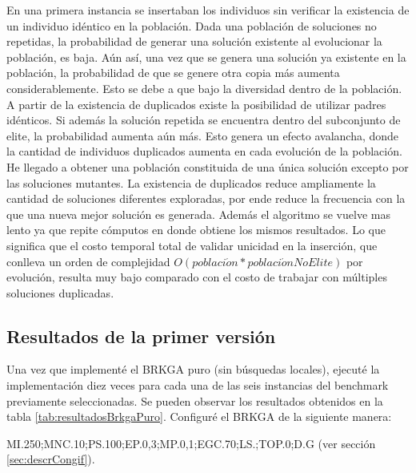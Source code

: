 \bigskip

En una primera instancia se insertaban los individuos sin verificar la existencia de un individuo idéntico en la población. Dada una población de soluciones no repetidas, la probabilidad de generar una solución existente al evolucionar la población, es baja. Aún así, una vez que se genera una solución ya existente en la población, la probabilidad de que se genere otra copia más aumenta considerablemente. Esto se debe a que bajo la diversidad dentro de la población. A partir de la existencia de duplicados existe la posibilidad de utilizar padres idénticos. Si además la solución repetida se encuentra dentro del subconjunto de elite, la probabilidad aumenta aún más. Esto genera un efecto avalancha, donde la cantidad de individuos duplicados aumenta en cada evolución de la población. He llegado a obtener una población constituida de una única solución excepto por las soluciones mutantes. La existencia de duplicados reduce ampliamente la cantidad de soluciones diferentes exploradas, por ende reduce la frecuencia con la que una nueva mejor solución es generada. Además el algoritmo se vuelve mas lento ya que repite cómputos en donde obtiene los mismos resultados. Lo que significa que el costo temporal total de validar unicidad en la inserción, que conlleva un orden de complejidad $O(poblaci\acute{o}n * poblaci\acute{o}nNoElite)$ por evolución, resulta muy bajo comparado con el costo de trabajar con múltiples soluciones duplicadas.

\subsection{Resultados de la primer versión}

Una vez que implementé el BRKGA puro (sin búsquedas locales), ejecuté la implementación diez veces para cada una de las seis instancias del benchmark previamente seleccionadas. Se pueden observar los resultados obtenidos en la tabla \ref{tab:resultadosBrkgaPuro}. Configuré el BRKGA de la siguiente manera: 

\bigskip

MI.250;MNC.10;PS.100;EP.0,3;MP.0,1;EGC.70;LS.;TOP.0;D.G (ver sección \ref{sec:descrCongif}).

\bigskip

